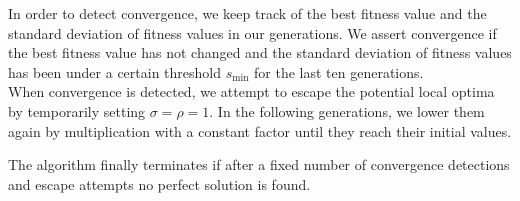 In order to detect convergence, we keep track of the best fitness value and the standard deviation of fitness values in our generations.
We assert convergence if the best fitness value has not changed and the standard deviation of fitness values has been under a certain threshold $s_{\min}$ for the last ten generations.\\

When convergence is detected, we attempt to escape the potential local optima by temporarily setting $\sigma = \rho = 1$.
In the following generations, we lower them again by multiplication with a constant factor until they reach their initial values.

The algorithm finally terminates if after a fixed number of convergence detections and escape attempts no perfect solution is found.
